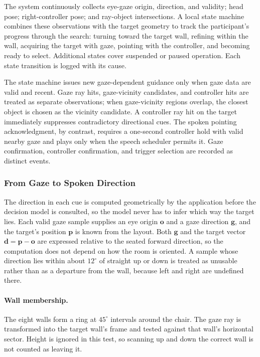 The system continuously collects eye-gaze origin, direction, and validity; head pose; right-controller pose; and ray-object intersections. A local state machine combines these observations with the target geometry to track the participant's progress through the search: turning toward the target wall, refining within the wall, acquiring the target with gaze, pointing with the controller, and becoming ready to select. Additional states cover suspended or paused operation. Each state transition is logged with its cause.

The state machine issues new gaze-dependent guidance only when gaze data are valid and recent. Gaze ray hits, gaze-vicinity candidates, and controller hits are treated as separate observations; when gaze-vicinity regions overlap, the closest object is chosen as the vicinity candidate. A controller ray hit on the target immediately suppresses contradictory directional cues. The spoken pointing acknowledgment, by contrast, requires a one-second controller hold with valid nearby gaze and plays only when the speech scheduler permits it. Gaze confirmation, controller confirmation, and trigger selection are recorded as distinct events.

\subsubsection{From Gaze to Spoken Direction}
\label{sec:guidance-geometry}
The direction in each cue is computed geometrically by the application before the decision model is consulted, so the model never has to infer which way the target lies. Each valid gaze sample supplies an eye origin $\mathbf{o}$ and a gaze direction $\mathbf{g}$, and the target's position $\mathbf{p}$ is known from the layout. Both $\mathbf{g}$ and the target vector $\mathbf{d}=\mathbf{p}-\mathbf{o}$ are expressed relative to the seated forward direction, so the computation does not depend on how the room is oriented. A sample whose direction lies within about $12^\circ$ of straight up or down is treated as unusable rather than as a departure from the wall, because left and right are undefined there.

\paragraph{Wall membership.} The eight walls form a ring at $45^\circ$ intervals around the chair. The gaze ray is transformed into the target wall's frame and tested against that wall's horizontal sector. Height is ignored in this test, so scanning up and down the correct wall is not counted as leaving it.

